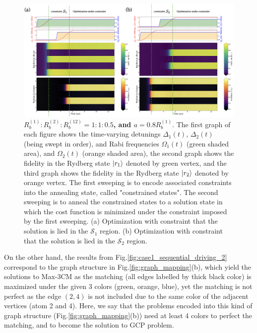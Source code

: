 \documentclass[%
 reprint,
nofootinbib,
 amsmath,amssymb,
 aps,
floatfix,
]{revtex4-2}
\begin{document}
\begin{figure}[ht!]
    \centering
    \includegraphics[width=14cm]{picture/case1_QOconstraint2.png}
    \caption{\textbf{$R^{(1)}_b:R^{(2)}_b:R^{(12)}_b=1:1:0.5$, and $a = 0.8R^{(1)}_b$}. The first graph of each figure shows the time-varying detunings $\Delta_1(t)$, $\Delta_2(t)$ (being swept in order), and Rabi frequencies $\Omega_1(t)$ (green shaded area), and $\Omega_2(t)$ (orange shaded area), the second graph shows the fidelity in the Rydberg state $\ket{r_1}$ denoted by green vertex, and the third graph shows the fidelity in the Rydberg state $\ket{r_2}$ denoted by orange vertex. The first sweeping is to encode associated constraints into the annealing state, called "constrained states". The second sweeping is to anneal the constrained states to a solution state in which the cost function is minimized under the constraint imposed by the first sweeping. (a) Optimization with constraint that the solution is lied in the $\mathcal{S}_1$ region. (b) Optimization with constraint that the solution is lied in the $\mathcal{S}_2$ region.}
    \label{fig:case1_sequential_driving_1}
\end{figure}
On the other hand, the results from Fig.\ref{fig:case1_sequential_driving_2} correspond to the graph structure in Fig.\ref{fig:graph_mapping}(b), which yield the solutions to Max-3CM as the matching (all edges labelled by thick black color) is maximized under the given 3 colors (green, orange, blue), yet the matching is not perfect as the edge $(2,4)$ is not included due to the same color of the adjacent vertices (atom 2 and 4). Here, we say that the problems encoded into this kind of graph structure (Fig.\ref{fig:graph_mapping}(b)) need at least 4 colors to perfect the matching, and to become the solution to GCP problem. 
\end{document}
